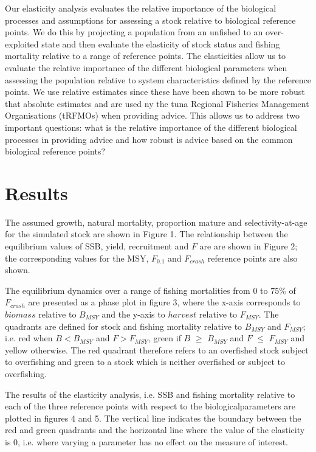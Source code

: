 \documentclass{pnastwo}
\begin{document}
\begin{article}
Our elasticity analysis evaluates the relative importance of the biological processes
and assumptions for assessing a stock relative to biological reference points. We do this by projecting 
a population from an unfished to an over-exploited state and then evaluate
the elasticity of stock status and fishing mortality relative to a range of reference points.
The elasticities allow us to evaluate the relative importance of
the different biological parameters when assessing the population relative
to system characteristics defined by the reference points.
We use relative estimates since these have been shown to be more robust that absolute estimates \cite{kell2003evaluation} and
are used ny the tuna Regional Fisheries Management Organisations (tRFMOs) when providing advice.
This allows us to address two important questions: what is the relative importance of the different
biological processes in providing advice and how robust is advice based on the
common biological reference points?

\section{Results}

The assumed growth, natural mortality, proportion mature and selectivity-at-age for the simulated stock are shown in Figure 1.
The relationship between the equilibrium values of SSB, yield, recruitment and $F$ are are shown in Figure 2;
the corresponding values for the MSY, $F_{0.1}$ and $F_{crash}$ reference points are also shown. 

The equilibrium dynamics over a range of fishing mortalities from 0 to 75\% of $F_{crash}$ are presented as a phase plot in figure 3,
where the x-axis corresponds to $biomass$ relative to $B_{MSY}$ and the y-axis to $harvest$ relative to $F_{MSY}$.
The quadrants are defined for stock and fishing mortality relative to $B_{MSY}$ and $F_{MSY}$; i.e. red when $B<B_{MSY}$ and $F>F_{MSY}$, green 
if $B$ $\geq$ $B_{MSY}$ and $F$ $\leq$ $F_{MSY}$ and yellow otherwise. The red quadrant therefore refers to an overfished stock subject to overfishing and  
green to a stock which is neither overfished or subject to overfishing.

The results of the elasticity analysis, i.e. SSB and fishing mortality relative to each of the three reference points with respect to the 
biologicalparameters are plotted in figures 4 and 5. The vertical line indicates the boundary between the red and green quadrants and the 
horizontal line where the value of the elasticity is 0, i.e. where varying a parameter has no effect on the measure of interest. 


\end{article}
\end{document}
